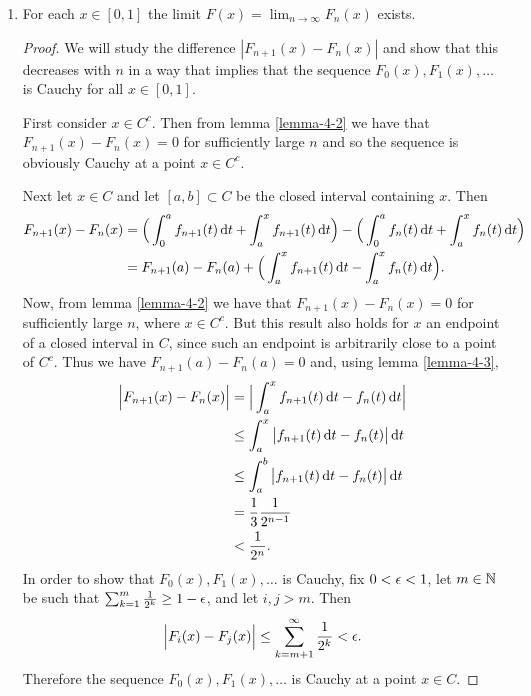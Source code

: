 \begin{enumerate}[label=(4.\arabic*)]

\item
  \begin{claim*}
    For each $x \in [0, 1]$ the limit $F(x) = \lim_{n\to\infty} F_n(x)$ exists.
  \end{claim*}

  \begin{proof}
    We will study the difference $|F_{n+1}(x) - F_n(x)|$ and show that this decreases with $n$ in a way that
    implies that the sequence $F_0(x), F_1(x), \ldots$ is Cauchy for all $x \in [0, 1]$.

    First consider $x \in C^c$. Then from lemma \ref{lemma-4-2} we have that $F_{n+1}(x) - F_{n}(x) = 0$ for
    sufficiently large $n$ and so the sequence is obviously Cauchy at a point $x \in C^c$.

    Next let $x \in C$ and let $[a, b] \subset C$ be the closed interval containing $x$. Then
    \begin{align*}
      F_{n+1}(x) - F_n(x)
      &= \Big(\int_0^a f_{n+1}(t) \dt + \int_a^x f_{n+1}(t) \dt\Big)
        - \Big(\int_0^a f_{n}(t) \dt   + \int_a^x f_{n}(t) \dt\Big) \\
      &= F_{n+1}(a) - F_{n}(a)
        + \Big(\int_a^x f_{n+1}(t) \dt - \int_a^x f_{n}(t) \dt\Big).
    \end{align*}
    Now, from lemma \ref{lemma-4-2} we have that $F_{n+1}(x) - F_{n}(x) = 0$ for sufficiently large $n$,
    where $x \in C^c$. But this result also holds for $x$ an endpoint of a closed interval in $C$, since such
    an endpoint is arbitrarily close to a point of $C^c$. Thus we have $F_{n+1}(a) - F_{n}(a) = 0$ and, using
    lemma \ref{lemma-4-3},
    \begin{align*}
      \Big|F_{n+1}(x) - F_n(x)\Big|
      &=    \Big|\int_a^x f_{n+1}(t) \dt - f_{n}(t) \dt\Big| \\
      &\leq \int_a^x \big|f_{n+1}(t) \dt - f_{n}(t)\big| \dt \\
      &\leq \int_a^b \big|f_{n+1}(t) \dt - f_{n}(t)\big| \dt \\
      &=    \frac{1}{3}\frac{1}{2^{n-1}} \\
      &<    \frac{1}{2^n}.
    \end{align*}
    In order to show that $F_0(x), F_1(x), \ldots$ is Cauchy, fix $0 < \epsilon < 1$, let $m \in \mathbb{N}$ be such
    that $\sum_{k=1}^m \frac{1}{2^k} \geq 1 - \epsilon$, and let $i, j > m$. Then
    \begin{align*}
      \Big|F_i(x) - F_j(x)\Big| \leq \sum_{k=m+1}^\infty \frac{1}{2^k} < \epsilon.
    \end{align*}
    Therefore the sequence $F_0(x), F_1(x), \ldots$ is Cauchy at a point $x \in C$.


\end{proof}
\end{enumerate}
